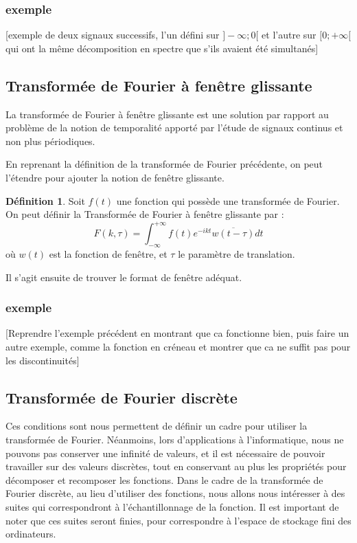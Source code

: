 \documentclass[]{article}
\theoremstyle{remark}
\theoremstyle{definition}
\newtheorem{mydef}{Définition}
\begin{document}
	\subsubsection{exemple}
	[exemple de deux signaux successifs, l'un défini sur $ ] -\infty; 0[$ et l'autre sur $ [0; +\infty[$ qui ont la même décomposition en spectre que s'ils avaient été simultanés]
	
	\subsection{Transformée de Fourier à fenêtre glissante}
	La transformée de Fourier à fenêtre glissante est une solution par rapport au problème de la notion de temporalité apporté par l'étude de signaux continus et non plus périodiques. 

	En reprenant la définition de la transformée de Fourier précédente, on peut l'étendre pour ajouter la notion de fenêtre glissante. 
		
	\begin{mydef}
		Soit $f(t)$ une fonction qui possède une transformée de Fourier. On peut définir la Transformée de Fourier à fenêtre glissante par :
		$$ F(k, \tau)= \int_{-\infty}^{+\infty}f(t)e^{-ikt} \overline{w(t - \tau)}dt$$
		où $w(t)$ est la fonction de fenêtre, et $\tau$ le paramètre de translation. 
	\end{mydef}
	Il s'agit ensuite de trouver le format de fenêtre adéquat. 
	
	\subsubsection{exemple}
	[Reprendre l'exemple précédent en montrant que ca fonctionne bien, puis faire un autre exemple, comme la fonction en créneau et montrer que ca ne suffit pas pour les discontinuités]
	
	
	\subsection{Transformée de Fourier discrète}
			
	Ces conditions sont nous permettent de définir un cadre pour utiliser la transformée de Fourier. Néanmoins, lors d'applications à l'informatique, nous ne pouvons pas conserver une infinité de valeurs, et il est nécessaire de pouvoir travailler sur des valeurs discrètes, tout en conservant au plus les propriétés pour décomposer et recomposer les fonctions. 		
	Dans le cadre de la transformée de Fourier discrète, au lieu d'utiliser des fonctions, nous allons nous intéresser à des suites qui correspondront à l'échantillonnage de la fonction. Il est important de noter que ces suites seront finies, pour correspondre à l'espace de stockage fini des ordinateurs. 
	
\end{document}
